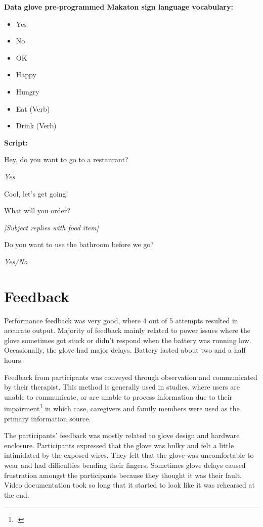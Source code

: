 \textbf{Data glove pre-programmed Makaton sign language vocabulary:}

\begin{itemize}
  \item Yes
  \item No
  \item OK
  \item Happy
  \item Hungry
  \item Eat (Verb)
  \item Drink (Verb)
\end{itemize}

\textbf{Script:}

\begin{description}
  \item Hey, do you want to go to a restaurant?
  \item \textit{Yes}
  \item Cool, let's get going!
  \item What will you order?
  \item \textit{[Subject replies with food item]}
  \item Do you want to use the bathroom before we go?
  \item \textit{Yes/No}
\end{description}

\section{Feedback} 

Performance feedback was very good, where 4 out of 5 attempts resulted in accurate output. Majority of feedback mainly related to power issues where the glove sometimes got stuck or didn't respond when the battery was running low. Occasionally, the glove had major delays. Battery lasted about two and a half hours. 

Feedback from participants was conveyed through observation and communicated by their therapist. This method is generally used in studies, where users are unable to communicate, or are unable to process information due to their impairment\footcite{Lazar2010} in which case, caregivers and family members were used as the primary information source. 

The participants' feedback was mostly related to glove design and hardware enclosure. Participants expressed that the glove was bulky and felt a little intimidated by the exposed wires. They felt that the glove was uncomfortable to wear and had difficulties bending their fingers. Sometimes glove delays caused frustration amongst the participants because they thought it was their fault. Video documentation took so long that it started to look like it was rehearsed at the end. 

